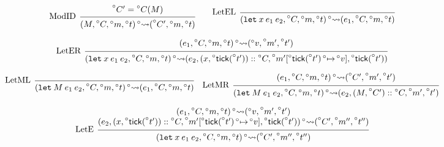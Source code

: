 \documentclass{article}
\theoremstyle{definition}
\newcommand*{\cons}{::}
\newcommand*{\A}[1]{\prescript{\circ}{}{#1}}
\newcommand*{\mem}{m}
\newcommand*{\semarrow}{\rightsquigarrow}
\newcommand*{\tick}{\mathsf{tick}}
\begin{document}
\begin{figure}[h!]
  \[
    \begin{prooftree}
      \hypo{\A{C'}=\A{C}(M)}
      \infer[left label=ModID]1{
      (M, \A{C}, \A\mem, \A{t})
      \A\semarrow
      (\A{C'}, \A\mem, \A{t})
      }
    \end{prooftree}\qquad
    \begin{prooftree}
      \infer[left label=LetEL]0{
      (\mathtt{let}\:x\:e_1\:e_2, \A{C}, \A\mem, \A{t})
      \A\semarrow
      (e_{1}, \A{C}, \A\mem, \A{t})
      }
    \end{prooftree}
  \]

  \[
    \begin{prooftree}
      \hypo{
        \begin{matrix}
          (e_{1}, \A{C}, \A\mem, \A{t})
          \A\semarrow
          (\A{v}, \A{\mem'}, \A{t'})
        \end{matrix}
      }
      \infer[left label=LetER]1{
      (\mathtt{let}\:x\:e_1\:e_2, \A{C}, \A\mem, \A{t})
      \A\semarrow
      (e_{2}, (x, \A\tick(\A{t'}))\cons \A{C}, \A{\mem'}[\A\tick(\A{t'})\A\mapsto \A{v}], \A\tick(\A{t'}))
      }
    \end{prooftree}
  \]

  \[
    \begin{prooftree}
      \infer[left label=LetML]0{
      (\mathtt{let}\:M\:e_{1}\:e_{2}, \A{C}, \A\mem, \A{t})
      \A\semarrow
      (e_{1}, \A{C}, \A\mem, \A{t})
      }
    \end{prooftree}\quad
    \begin{prooftree}
      \hypo{
        \begin{matrix}
          (e_{1}, \A{C}, \A\mem, \A{t})
          \A\semarrow
          (\A{C'}, \A{\mem'}, \A{t'})
        \end{matrix}
      }
      \infer[left label=LetMR]1{
      (\mathtt{let}\:M\:e_{1}\:e_{2}, \A{C}, \A\mem, \A{t})
      \A\semarrow
      (e_{2}, (M, \A{C'})\cons \A{C}, \A{\mem'}, \A{t'})
      }
    \end{prooftree}
  \]

  \[
    \begin{prooftree}
      \hypo{
        \begin{matrix}
          (e_{1}, \A{C}, \A\mem, \A{t})
          \A\semarrow
          (\A{v}, \A{\mem'}, \A{t'}) \\
          (e_{2}, (x, \A\tick(\A{t'}))\cons \A{C}, \A{\mem'}[\A\tick(\A{t'})\A\mapsto \A{v}], \A\tick(\A{t'}))
          \A\semarrow
          (\A{C'}, \A{\mem''}, \A{t''})
        \end{matrix}
      }
      \infer[left label=LetE]1{
      (\mathtt{let}\:x\:e_1\:e_2, \A{C}, \A\mem, \A{t})
      \A\semarrow
      (\A{C'}, \A{\mem''}, \A{t''})
      }
    \end{prooftree}
  \]


\end{figure}
\end{document}
